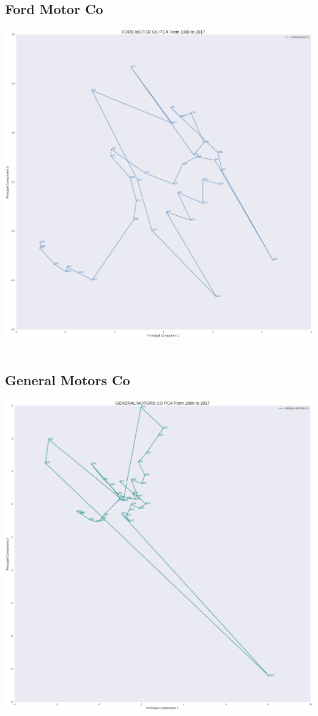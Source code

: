 \subsection{Ford Motor Co}
\includegraphics[width=1\textwidth]{./Ford}\\[0.1in] \\
\subsection{General Motors Co}
\includegraphics[width=1\textwidth]{./GM}\\[0.1in] \\

